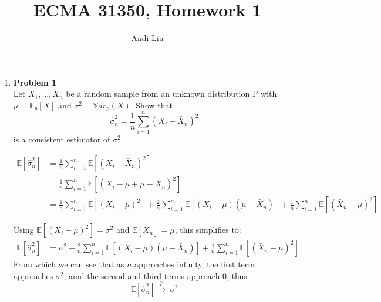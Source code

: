 \documentclass{article}
\begin{document}
\title{ECMA 31350, Homework 1}
\date{}
\author{Andi Liu}
\maketitle
\thispagestyle{fancy}

\begin{enumerate}
    \item \textbf{Problem 1} \\
    Let $X_1, \dots, X_n$ be a random sample from an unknown distribution P with $\mu = \mathbb{E}_p[X]$ and $\sigma^2 = \mathbb{V}ar_p(X)$. Show that
    \[ \widehat{\sigma}_n^2 = \frac{1}{n} \sum_{i = 1}^n (X_i - \bar{X}_n)^2\]
    is a consistent estimator of $\sigma^2$.
    \begin{solution}
    {
        
    \begin{align*}
    \mathbb{E}[\widehat{\sigma}_n^2] &= \frac{1}{n} \sum_{i=1}^n \mathbb{E}[(X_i - \bar{X}_n)^2] \\
    &= \frac{1}{n} \sum_{i=1}^n \mathbb{E}[(X_i - \mu + \mu - \bar{X}_n)^2] \\
    &= \frac{1}{n} \sum_{i=1}^n \mathbb{E}[(X_i - \mu)^2] + \frac{2}{n} \sum_{i=1}^n \mathbb{E}[(X_i - \mu)(\mu - \bar{X}_n)] + \frac{1}{n} \sum_{i=1}^n \mathbb{E}[(\bar{X}_n - \mu)^2]
    \end{align*}

    Using \(\mathbb{E}[(X_i - \mu)^2] = \sigma^2\) and \(\mathbb{E}[\bar{X}_n] = \mu\), this simplifies to:
    \begin{align*}
    \mathbb{E}[\widehat{\sigma}_n^2] &= \sigma^2 + \frac{2}{n} \sum_{i=1}^n \mathbb{E}[(X_i - \mu)(\mu - \bar{X}_n)] + \frac{1}{n} \sum_{i=1}^n \mathbb{E}[(\bar{X}_n - \mu)^2]
    \end{align*}
    From which we can see that as $n$ approaches infinity, the first term approaches $\sigma^2$, amd the second and third terms approach 0, thus
    \[
    \mathbb{E}[\widehat{\sigma}_n^2] \xrightarrow[]{p} \ \sigma^2
    \]
    }
    \end{solution}


\end{enumerate}
\end{document}
